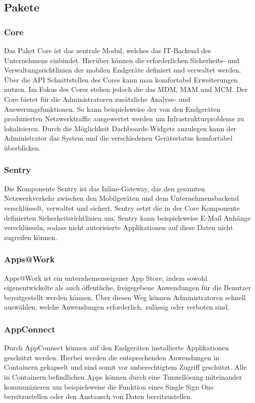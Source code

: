 \subsection {Pakete}
\subsubsection {Core}
Das Paket Core ist das zentrale Modul, welches das IT-Backend des Unternehmens einbindet. Hierüber können die erforderlichen Sicherheits- und Verwaltungsrichtlinien der mobilen Endgeräte definiert und verwaltet werden. Über die  API Schnittstellen des Cores kann man komfortabel Erweiterungen nutzen. Im Fokus des Cores stehen jedoch die das MDM, MAM und MCM. Der Core bietet für die Administratoren zusätzliche Analyse- und Auswerungsfunktionen. So kann beispielsweise der von den Endgeräten produzierten Netzwerktraffic ausgewertet werden um Infrastrukturprobleme zu lokalisieren. Durch die Möglichkeit Dachboards-Widgets anzulegen kann der Administrator das System und die verschiedenen Gerätestatus komfortabel überblicken. 
\subsubsection {Sentry}
Die Komponente Sentry ist das Inline-Gateway, das den gesamten Netzwerkverkehr zwischen den Mobilgeräten und dem Unternehmensbackend verschlüsselt, verwaltet und sichert. Sentry setzt die in der Core Komponente definierten Sicherheitsrichtlinien um. Sentry kann beispielsweise E-Mail Anhänge verschlüsseln, sodass nicht autorisierte Applikationen auf diese Daten nicht zugreifen können. 

\subsubsection {Apps@Work}
Apps@Work ist ein unternhemenseigener App Store, indem sowohl eigenentwickelte als auch öffentliche, freigegebene Anwendungen für die Benutzer bereitgestellt werden können. Über diesen Weg können Administratoren schnell auswählen, welche Anwendungen erforderlich, zulässig oder verboten sind. 
\subsubsection {AppConnect}
Durch AppConnect können auf den Endgeräten installierte Applikationen geschützt werden. Hierbei werden die entsprechenden Anwendungen in Containern gekapselt und sind somit vor unberechtigtem Zugriff geschützt. Alle in Containern befindlichen Apps können durch eine Tunnellösung miteinander kommunizieren um beispielsweise die Funktion eines Single Sign Ons bereitzustellen oder den Austausch von Daten bereitzustellen. 
